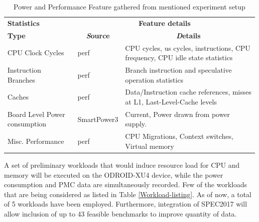 \documentclass[conference]{IEEEtran}
\begin{document}
        \begin{table}[htbp]
            \caption{Power and Performance Feature gathered from mentioned experiment setup}
            \begin{center}
                \begin{tabular}{|p{1.8cm}|p{1.5cm}|p{3.7cm}|}
                    \hline
                    \textbf{Statistics}&\multicolumn{2}{|c|}{\textbf{Feature details}} \\
                    \cline{2-3} 
                    \textbf{Type} & \multicolumn{1}{|c|}{\textbf{\textit Source}} & \multicolumn{1}{|c|}{\textbf{\textit Details}} \\
                    \hline
                    CPU Clock Cycles  & perf\cite{2015137}  & CPU cycles, us cycles, instructions, CPU frequency, CPU idle state statistics \\
                    \hline
                    Instruction Branches  & perf & Branch instruction and speculative operation statistics \\
                    \hline
                    Caches   & perf  & Data/Instruction cache references, misses at L1, Last-Level-Cache levels  \\
                    \hline
                    Board Level Power consumption & SmartPower3\cite{odroid-smartpower3} & Current, Power drawn from power supply. \\
                    \hline
                    Misc. Performance  & perf  & CPU Migrations, Context switches, Virtual memory \\
                    \hline
                \end{tabular}
                \label{Power-Perf-data-gathered}
            \end{center}
        \end{table}

        \par A set of preliminary workloads that would induce resource load for CPU and memory will be executed on the ODROID-XU4 device, while the power consumption and PMC data are simultaneously recorded. Few of the workloads that are being considered as listed in Table \ref{Workload-listing}. As of now, a total of 5 workloads have been employed. Furthermore, integration of SPEC2017 will allow inclusion of up to 43 feasible benchmarks to improve quantity of data.
\end{document}
